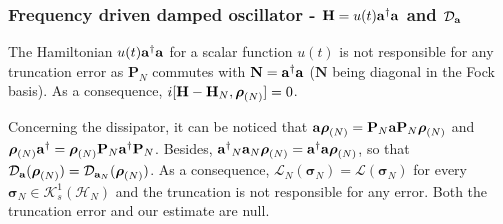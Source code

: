 \documentclass[a4paper,onecolumn,amsmath,amssymb,amsfonts,accepted=2026-03-06]{quantumarticle}
\newcommand{\xL}{\mathcal{L}}
\newcommand{\xH}{\mathcal{H}}
\newcommand{\xK}{\mathcal{K}}
\newcommand{\cD}{\mathcal D}
\newcommand{\Hamil}{{\bf H}}
\newcommand{\Proj}[1]{\mathbf{P}_{#1}}
\newcommand{\destroy}{{\bf a}}
\newcommand{\create}{{\bf a^\dag}}
\newcommand{\rN}{{\boldsymbol{\rho}_{(N)}}}
\newcommand{\Nop}{\mathbf{N}}
\begin{document}
\subsubsection{\texorpdfstring{Frequency driven damped oscillator - $\Hamil = u(t) \create \destroy$ and $\cD_{\destroy}$}{Frequency driven damped oscillator}}
\label{ex:aadag}
The Hamiltonian $u(t) \create \destroy$ for a scalar function $u(t)$ is not responsible for any truncation error as $\Proj{N}$ commutes with $\Nop=\create \destroy$ ($\Nop$ being diagonal in the Fock basis). As a consequence, $i[\Hamil-\Hamil_N,\rN]=0$.

Concerning the dissipator, it can be noticed that $\destroy \rN = \Proj{N} \destroy \Proj{N} \rN$ and $\rN \create = \rN \Proj{N} \create \Proj{N} $. Besides, $\create_N \destroy_N \rN=\create \destroy \rN$, so that $\cD_{\destroy}(\rN)=\cD_{\destroy_N}(\rN)$.
As a consequence, $\xL_N(\boldsymbol{\sigma}_N)=\xL(\boldsymbol{\sigma}_N)$ for every $\boldsymbol{\sigma}_N\in \xK^1_s(\xH_N)$ and the truncation is not responsible for any error. Both the truncation error and our estimate are null.
\end{document}

